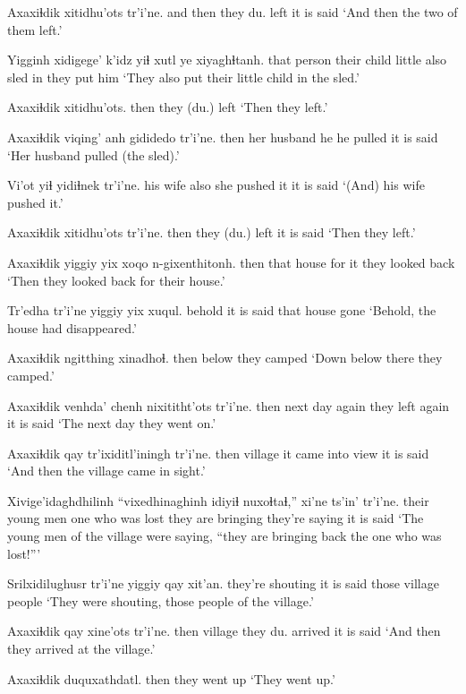 \documentclass[12pt]{article}
\begin{document}
\gll Axaxiɬdik xitidhu'ots tr'i'ne.
{and then} {they du. left} {it is said}
\glt `And then the two of them left.'
\glend

\gll Yigginh xidigege' k'idz yiɬ xutl ye xiyaghɬtanh.
{that person} {their child} little also sled in {they put him}
\glt `They also put their little child in the sled.'
\glend

\gll Axaxiɬdik xitidhu'ots.
then  {they (du.) left}
\glt `Then they left.'
\glend

\gll Axaxiɬdik viqing' anh gididedo tr'i'ne.
then  {her husband} he {he pulled}  {it is said}
\glt `Her husband pulled (the sled).'
\glend

\gll Vi'ot  yiɬ yidiɬnek tr'i'ne.
{his wife} also {she pushed it} {it is said}
\glt `(And) his wife pushed it.'
\glend

\gll Axaxiɬdik xitidhu'ots tr'i'ne.
then  {they (du.) left} {it is said}
\glt `Then they left.'
\glend

\gll Axaxiɬdik yiggiy  yix xoqo n-gixenthitonh.
then  that  house {for it} {they looked back}
\glt `Then they looked back for their house.'
\glend

\gll Tr'edha tr'i'ne yiggiy yix xuqul.
behold  {it is said} that house gone
\glt `Behold, the house had disappeared.'
\glend

\gll Axaxiɬdik ngitthing xinadhoɬ.
then  below  {they camped}
\glt `Down below there they camped.'
\glend

\gll Axaxiɬdik venhda' chenh nixititht'ots tr'i'ne.
then  {next day} again {they left again} {it is said}
\glt `The next day they went on.'
\glend

\gll Axaxiɬdik qay tr'ixiditl'iningh tr'i'ne.
then  village  {it came into view} {it is said}
\glt `And then the village came in sight.'
\glend

\gll Xivige'idaghdhilinh ``vixedhinaghinh {idiyiɬ nuxoɬtaɬ,''} xi'ne ts'in' tr'i'ne.
{their young men} {one who was lost} {they are bringing} {they're saying} {} {it is said}
\glt `The young men of the village were saying, ``they are bringing back the one who was lost!'''
\glend

\gll Srilxidilughusr tr'i'ne yiggiy  qay  xit'an.
{they're shouting}  {it is said} those  village  people
\glt `They were shouting, those people of the village.'
\glend

\gll Axaxiɬdik qay  xine'ots tr'i'ne.
then  village  {they du. arrived} {it is said}
\glt `And then they arrived at the village.'
\glend

\gll Axaxiɬdik duquxathdatl.
then  {they went up}
\glt `They went up.'
\glend
\end{document}
